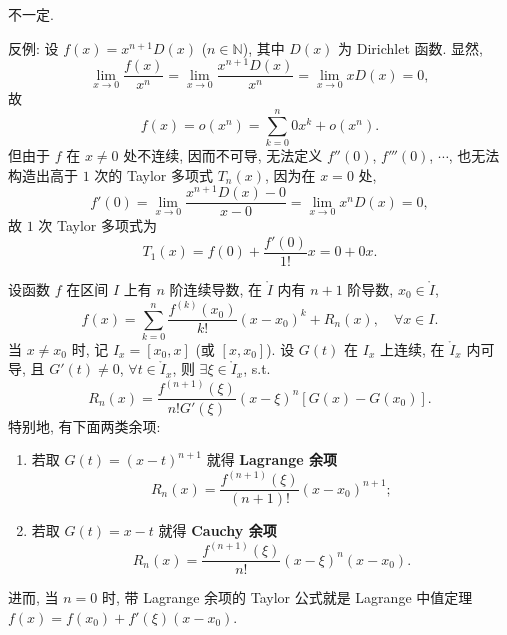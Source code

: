 \begin{solution}
不一定.

反例: 设 $f(x)=x^{n+1}D(x)$ ($n\in\mathbb{N}$), 其中 $D(x)$ 为 Dirichlet 函数. 显然,
\[
\lim_{x\to 0}\frac{f(x)}{x^{n}}=\lim_{x\to 0}\frac{x^{n+1}D(x)}{x^{n}}=\lim_{x\to 0}xD(x)=0,
\]
故
\[
f(x)=o(x^{n})=\sum_{k=0}^{n}0x^{k}+o(x^{n}).
\]
但由于 $f$ 在 $x\neq 0$ 处不连续, 因而不可导, 无法定义 $f''(0)$, $f'''(0)$, $\cdots$, 也无法构造出高于 $1$ 次的 Taylor 多项式 $T_{n}(x)$, 因为在 $x=0$ 处,
\[
f'(0)=\lim_{x\to 0}\frac{x^{n+1}D(x)-0}{x-0}=\lim_{x\to 0}x^{n}D(x)=0,
\]
故 $1$ 次 Taylor 多项式为
\[
T_{1}(x)=f(0)+\frac{f'(0)}{1!}x=0+0x.
\]
\end{solution}

\begin{theorem}\label{thm:4.1.3}
设函数 $f$ 在区间 $I$ 上有 $n$ 阶连续导数, 在 $\mathring{I}$ 内有 $n+1$ 阶导数, $x_{0}\in\mathring{I}$,
\[
f(x)=\sum_{k=0}^{n}\frac{f^{(k)}(x_{0})}{k!}(x-x_{0})^{k}+R_{n}(x),\quad \forall x\in I.
\]
当 $x\neq x_{0}$ 时, 记 $I_{x}=[x_{0},x]$ (或 $[x,x_{0}]$). 设 $G(t)$ 在 $I_{x}$ 上连续, 在 $\mathring{I}_{x}$ 内可导, 且 $G'(t)\neq 0$, $\forall t\in\mathring{I}_{x}$, 则 $\exists \xi\in\mathring{I}_{x}$, s.t.
\[
R_{n}(x)=\frac{f^{(n+1)}(\xi)}{n!G'(\xi)}(x-\xi)^{n}\left[G(x)-G(x_{0})\right].
\]
特别地, 有下面两类余项:
\begin{enumerate}[label=(\arabic*)]
  \item 若取 $G(t)=(x-t)^{n+1}$ 就得 \textbf{Lagrange 余项}
  \[
  R_{n}(x)=\frac{f^{(n+1)}(\xi)}{(n+1)!}(x-x_{0})^{n+1};
\]
  \item 若取 $G(t)=x-t$ 就得 \textbf{Cauchy 余项}
  \[
  R_{n}(x)=\frac{f^{(n+1)}(\xi)}{n!}(x-\xi)^{n}(x-x_{0}).
\]
\end{enumerate}
进而, 当 $n=0$ 时, 带 Lagrange 余项的 Taylor 公式就是 Lagrange 中值定理 $f(x)=f(x_{0})+f'(\xi)(x-x_{0})$.
\end{theorem}

